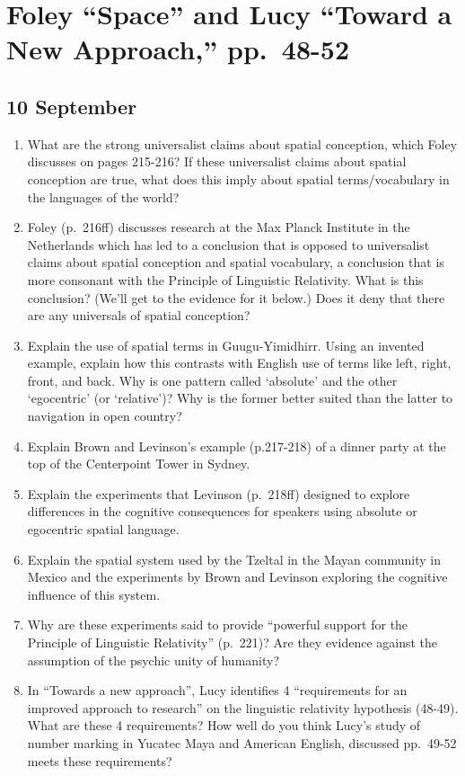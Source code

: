 \documentclass[]{article}
\date{}
\begin{document}
\section{\texorpdfstring{Foley ``Space'' and Lucy ``Toward a New
Approach,''
pp.~48-52}{Foley Space and Lucy Toward a New Approach, pp.~48-52}}\label{foley-space-and-lucy-toward-a-new-approach-pp.48-52}

\subsection{10 September}\label{september}

\begin{enumerate}
\def\labelenumi{\arabic{enumi}.}
\item
  What are the strong universalist claims about spatial conception,
  which Foley discusses on pages 215-216? If these universalist claims
  about spatial conception are true, what does this imply about spatial
  terms/vocabulary in the languages of the world?
\item
  Foley (p.~216ff) discusses research at the Max Planck Institute in the
  Netherlands which has led to a conclusion that is opposed to
  universalist claims about spatial conception and spatial vocabulary, a
  conclusion that is more consonant with the Principle of Linguistic
  Relativity. What is this conclusion? (We'll get to the evidence for it
  below.) Does it deny that there are any universals of spatial
  conception?
\item
  Explain the use of spatial terms in Guugu-Yimidhirr. Using an invented
  example, explain how this contrasts with English use of terms like
  left, right, front, and back. Why is one pattern called `absolute' and
  the other `egocentric' (or `relative')? Why is the former better
  suited than the latter to navigation in open country?
\item
  Explain Brown and Levinson's example (p.217-218) of a dinner party at
  the top of the Centerpoint Tower in Sydney.
\item
  Explain the experiments that Levinson (p.~218ff) designed to explore
  differences in the cognitive consequences for speakers using absolute
  or egocentric spatial language.
\item
  Explain the spatial system used by the Tzeltal in the Mayan community
  in Mexico and the experiments by Brown and Levinson exploring the
  cognitive influence of this system.
\item
  Why are these experiments said to provide ``powerful support for the
  Principle of Linguistic Relativity'' (p.~221)? Are they evidence
  against the assumption of the psychic unity of humanity?
\item
  In ``Towards a new approach'', Lucy identifies 4 ``requirements for an
  improved approach to research'' on the linguistic relativity
  hypothesis (48-49). What are these 4 requirements? How well do you
  think Lucy's study of number marking in Yucatec Maya and American
  English, discussed pp.~49-52 meets these requirements?
\end{enumerate}
\end{document}
